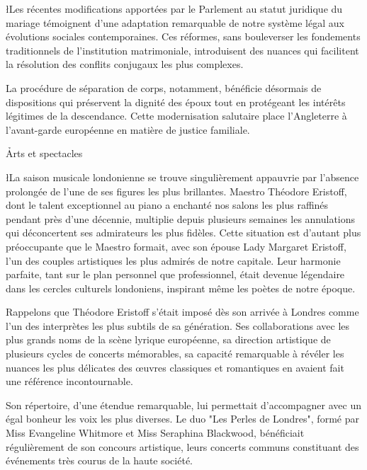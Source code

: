 \documentclass{news}
\begin{document}
\l{L}es récentes modifications apportées par le Parlement au statut juridique du mariage témoignent d'une adaptation remarquable de notre système légal aux évolutions sociales contemporaines. Ces réformes, sans bouleverser les fondements traditionnels de l'institution matrimoniale, introduisent des nuances qui facilitent la résolution des conflits conjugaux les plus complexes.

La procédure de séparation de corps, notamment, bénéficie désormais de dispositions qui préservent la dignité des époux tout en protégeant les intérêts légitimes de la descendance. Cette modernisation salutaire place l'Angleterre à l'avant-garde européenne en matière de justice familiale.

\h{Arts et spectacles}

\l{L}a saison musicale londonienne se trouve singulièrement appauvrie par l'absence prolongée de l'une de ses figures les plus brillantes. Maestro Théodore Eristoff, dont le talent exceptionnel au piano a enchanté nos salons les plus raffinés pendant près d'une décennie, multiplie depuis plusieurs semaines les annulations qui déconcertent ses admirateurs les plus fidèles.
Cette situation est d'autant plus préoccupante que le Maestro formait, avec son épouse Lady Margaret Eristoff, l'un des couples artistiques les plus admirés de notre capitale. Leur harmonie parfaite, tant sur le plan personnel que professionnel, était devenue légendaire dans les cercles culturels londoniens, inspirant même les poètes de notre époque.

Rappelons que Théodore Eristoff s'était imposé dès son arrivée à Londres comme l'un des interprètes les plus subtils de sa génération. Ses collaborations avec les plus grands noms de la scène lyrique européenne, sa direction artistique de plusieurs cycles de concerts mémorables, sa capacité remarquable à révéler les nuances les plus délicates des œuvres classiques et romantiques en avaient fait une référence incontournable.

Son répertoire, d'une étendue remarquable, lui permettait d'accompagner avec un égal bonheur les voix les plus diverses. Le duo "Les Perles de Londres", formé par Miss Evangeline Whitmore et Miss Seraphina Blackwood, bénéficiait régulièrement de son concours artistique, leurs concerts communs constituant des événements très courus de la haute société.
\end{document}
